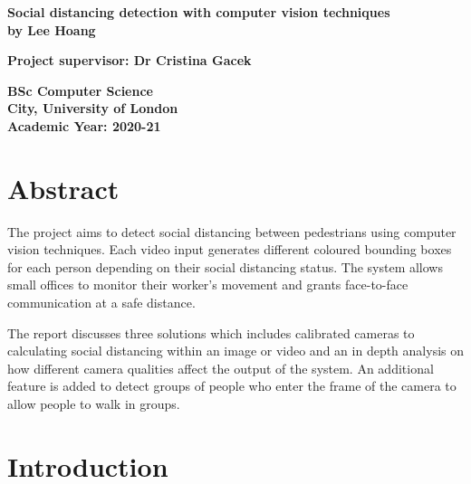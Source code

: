 \documentclass[12pt]{report}
\begin{document}
\begin{titlepage}
	\begin{center}
		\vspace*{1cm}
		
		{\Huge \textbf{Social distancing detection with computer vision techniques}}
		\vspace{2mm} \\
{\LARGE 
		\vspace{2mm}
		\textbf{by Lee Hoang}}
		\vspace{2mm}
	
		
		\vspace{1.5cm}
		
		\vfill
		{\Large \textbf{Project supervisor: Dr Cristina Gacek}}
		
		\vspace{0.8cm}
		
{\Large 		\textbf{BSc Computer Science\\
		City, University of London\\
		Academic Year: 2020-21\\}}
		
	\end{center}
\end{titlepage}

\tableofcontents


\pagebreak

\chapter*{Abstract}

The project aims to detect social distancing between pedestrians using computer vision techniques. Each video input generates different coloured bounding boxes for each person depending on their social distancing status. The system allows small offices to monitor their worker's movement and grants face-to-face communication at a safe distance.

\vspace{2mm}
The report discusses three solutions which includes calibrated cameras to calculating social distancing within an image or video and an in depth analysis on how different camera qualities affect the output of the system. An additional feature is added to detect groups of people who enter the frame of the camera to allow people to walk in groups. 


\chapter{Introduction}
\end{document}

